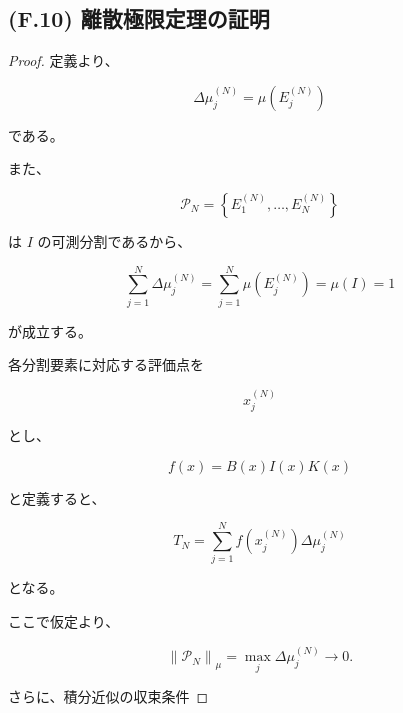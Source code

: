 \documentclass[a4paper,11pt]{article}
\begin{document}
\subsection{(F.10) 離散極限定理の証明}
\label{subsec:F10}

\begin{proof}

定義より、

\begin{equation}
    \Delta\mu_j^{(N)}
    =
    \mu\!\left(E_j^{(N)}\right)
\end{equation}

である。

また、

\begin{equation}
    \mathcal{P}_N
    =
    \left\{
        E_1^{(N)},
        \ldots,
        E_N^{(N)}
    \right\}
\end{equation}

は $I$ の可測分割であるから、

\begin{equation}
    \sum_{j=1}^{N}
    \Delta\mu_j^{(N)}
    =
    \sum_{j=1}^{N}
    \mu\!\left(E_j^{(N)}\right)
    =
    \mu(I)
    =
    1
\end{equation}

が成立する。

各分割要素に対応する評価点を

\begin{equation}
    x_j^{(N)}
\end{equation}

とし、

\begin{equation}
    f(x)=B(x)I(x)K(x)
\end{equation}

と定義すると、

\begin{equation}
    T_N
    =
    \sum_{j=1}^{N}
    f\!\left(x_j^{(N)}\right)
    \Delta\mu_j^{(N)}
\end{equation}

となる。

ここで仮定より、

\begin{equation}
    \left\|
    \mathcal{P}_N
    \right\|_\mu
    =
    \max_j
    \Delta\mu_j^{(N)}
    \longrightarrow0.
\end{equation}

さらに、積分近似の収束条件


\end{proof}
\end{document}
